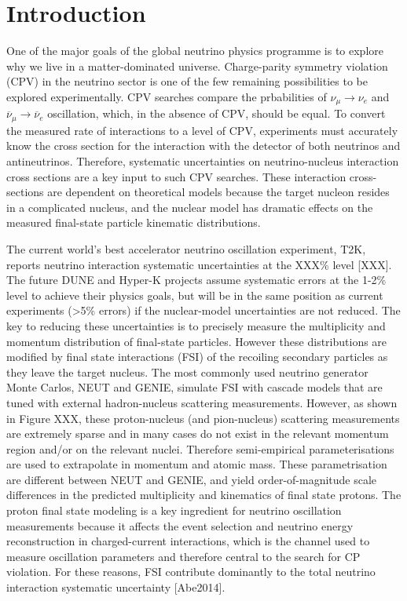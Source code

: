 \section{Introduction}

One of the major goals of the global neutrino physics programme is to explore why we live in a matter-dominated universe. Charge-parity symmetry violation (CPV) in the neutrino sector is one of the few remaining possibilities to be explored experimentally. CPV searches compare the prbabilities of $\nu_{\mu}\!\rightarrow\!\nu_e$ and $\overline{\nu}_{\mu}\!\rightarrow\!\overline{\nu}_e$ oscillation, which, in the absence of CPV, should be equal. To convert the measured rate of interactions to a level of CPV, experiments must accurately know the cross section for the interaction with the detector of both neutrinos and antineutrinos. Therefore, systematic uncertainties on neutrino-nucleus interaction cross sections are a key input to such CPV searches.  These interaction cross-sections are dependent on theoretical models because the target nucleon resides in a complicated nucleus, and the nuclear model has dramatic effects on the measured final-state particle kinematic distributions.

The current world’s best accelerator neutrino oscillation experiment, T2K, reports neutrino interaction systematic uncertainties at the XXX\% level [XXX].  The future DUNE and Hyper-K projects assume systematic errors at the 1-2\% level to achieve their physics goals, but will be in the same position as current experiments (>5\% errors) if the nuclear-model uncertainties are not reduced.  The key to reducing these uncertainties is to precisely measure the multiplicity and momentum distribution of final-state particles. However these distributions are modified by final state interactions (FSI) of the recoiling secondary particles as they leave the target nucleus.  The most commonly used neutrino generator Monte Carlos, NEUT and GENIE, simulate FSI with cascade models that are tuned with external hadron-nucleus scattering measurements.  However, as shown in Figure XXX, these proton-nucleus (and pion-nucleus) scattering measurements are extremely sparse and in many cases do not exist in the relevant momentum region and/or on the relevant nuclei.  Therefore semi-empirical parameterisations are used to extrapolate in momentum and atomic mass.  These parametrisation are different between NEUT and GENIE, and yield order-of-magnitude scale differences in the predicted multiplicity and kinematics of final state protons.  The proton final state modeling is a key ingredient for neutrino oscillation measurements because it affects the event selection and neutrino energy reconstruction in charged-current interactions, which is the channel used to measure oscillation parameters and therefore central to the search for CP violation.  For these reasons, FSI contribute dominantly to the total neutrino interaction systematic uncertainty [Abe2014].

